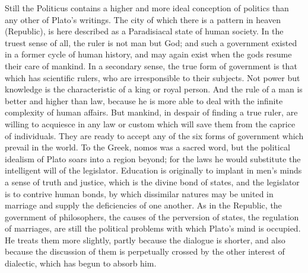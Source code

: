 \documentclass[11pt,letter]{article}
\begin{document}
\par  Still the Politicus contains a higher and more ideal conception of politics than any other of Plato's writings. The city of which there is a pattern in heaven (Republic), is here described as a Paradisiacal state of human society. In the truest sense of all, the ruler is not man but God; and such a government existed in a former cycle of human history, and may again exist when the gods resume their care of mankind. In a secondary sense, the true form of government is that which has scientific rulers, who are irresponsible to their subjects. Not power but knowledge is the characteristic of a king or royal person. And the rule of a man is better and higher than law, because he is more able to deal with the infinite complexity of human affairs. But mankind, in despair of finding a true ruler, are willing to acquiesce in any law or custom which will save them from the caprice of individuals. They are ready to accept any of the six forms of government which prevail in the world. To the Greek, nomos was a sacred word, but the political idealism of Plato soars into a region beyond; for the laws he would substitute the intelligent will of the legislator. Education is originally to implant in men's minds a sense of truth and justice, which is the divine bond of states, and the legislator is to contrive human bonds, by which dissimilar natures may be united in marriage and supply the deficiencies of one another. As in the Republic, the government of philosophers, the causes of the perversion of states, the regulation of marriages, are still the political problems with which Plato's mind is occupied. He treats them more slightly, partly because the dialogue is shorter, and also because the discussion of them is perpetually crossed by the other interest of dialectic, which has begun to absorb him.
\end{document}

